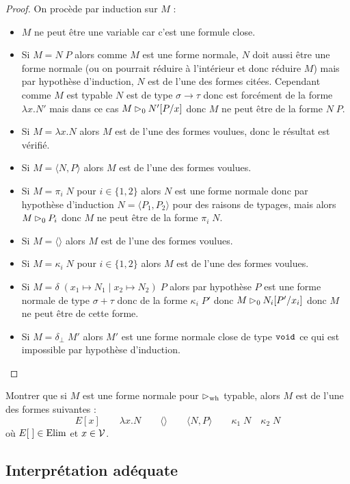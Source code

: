 \begin{proof}
    On procède par induction sur $M$ :
    \begin{itemize}[label=$\bullet$]
        \item $M$ ne peut être une variable car c'est une formule close.
        \item Si $M = N\;P$ alors comme $M$ est une forme normale, $N$ doit aussi être une forme normale (ou on pourrait réduire à l'intérieur et donc réduire $M$) mais par hypothèse d'induction, $N$ est de l'une des formes citées. Cependant comme $M$ est typable $N$ est de type $\sigma\to\tau$ donc est forcément de la forme $\lambda x.N'$ mais dans ce cas $M \rhd_0 N'[P/x]$ donc $M$ ne peut être de la forme $N\;P$.
        \item Si $M = \lambda x.N$ alors $M$ est de l'une des formes voulues, donc le résultat est vérifié.
        \item Si $M = \langle N,P\rangle$ alors $M$ est de l'une des formes voulues.
        \item Si $M = \pi_i\;N$ pour $i\in\{1,2\}$ alors $N$ est une forme normale donc par hypothèse d'induction $N = \langle P_1,P_2\rangle$ pour des raisons de typages, mais alors $M\rhd_0 P_i$ donc $M$ ne peut être de la forme $\pi_i\;N$.
        \item Si $M = \langle\rangle$ alors $M$ est de l'une des formes voulues.
        \item Si $M = \kappa_i\;N$ pour $i\in\{1,2\}$ alors $M$ est de l'une des formes voulues.
        \item Si $M = \delta\;(x_1\mapsto N_1\mid x_2\mapsto N_2)\;P$ alors par hypothèse $P$ est une forme normale de type $\sigma+\tau$ donc de la forme $\kappa_i\;P'$ donc $M\rhd_0 N_i[P'/x_i]$ donc $M$ ne peut être de cette forme.
        \item Si $M = \delta_\bot\;M'$ alors $M'$ est une forme normale close de type $\texttt{void}$ ce qui est impossible par hypothèse d'induction.
    \end{itemize}
\end{proof}

\begin{exo}
    Montrer que si $M$ est une forme normale pour $\rhd_{\mathrm{wh}}$ typable, alors $M$ est de l'une des formes suivantes : $$E[x]\qquad \lambda x.N\qquad \langle\rangle\qquad \langle N,P\rangle\qquad \kappa_1\;N\quad \kappa_2\;N$$ où $E[\;]\in\mathrm{Elim}$ et $x\in\mathcal V$.
\end{exo}

\subsection{Interprétation adéquate}

